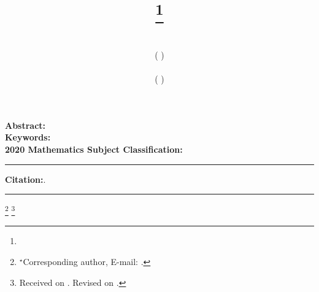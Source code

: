 \documentclass[English]{APSart}
\begin{document}

\title{\entitle %
\thanks{}
}
\author{\textrm{ \enfirstauthor}\\[-2pt]
	( \enfirstinst) \\[1pt]
	\textrm{\ensecondauthor}\\[-2pt]
	( \ensecondinst)
}


%

\date{}  %
\maketitle
\vspace{-6mm}
\begin{center}
	\begin{minipage}[c]{14cm}
		\textbf{Abstract:}\quad\enabstract\\
		\textbf{Keywords:}\quad\enkeywords\\
		\textbf{2020 Mathematics Subject Classification:}\quad\amsno\\
		\rule[3mm]{14cm}{0.2pt}\vskip-4mm
		\textbf{Citation:}\quad {}.
		\\  %
		\rule[3mm]{14cm}{0.2pt}
	\end{minipage}
\end{center}
\footnote[0]{\hskip-1.5mm
	$^\star$Corresponding author, E-mail: \caemail.}
\footnote[0]{Received on \receivedate{}. Revised on \modifydate{}.}\vspace{-1em}
\end{document}
